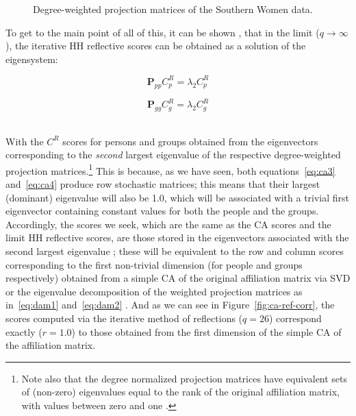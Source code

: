 \documentclass[a4paper,fleqn]{cas-sc}
\begin{document}
\begin{figure}[ht!]
\begin{subfigure}[b]{0.55\textwidth}
    \end{subfigure}
    \caption{Degree-weighted projection matrices of the Southern Women data.}
    \label{fig:dwproj}
\end{figure}

To get to the main point of all of this, it can be shown \citep{van2021correspondence}, that in the limit ($q \rightarrow \infty$), the iterative HH reflective scores can be obtained as a solution of the eigensystem:

\begin{equation}
    \mathbf{P}_{pp}C^R_p = \lambda_2C^R_p
    \label{eq:dam1}
\end{equation}

\begin{equation}
    \mathbf{P}_{gg}C^R_g = \lambda_2C^R_g
    \label{eq:dam2}
\end{equation}\

With the $C^R$ scores for persons and groups obtained from the eigenvectors corresponding to the \textit{second} largest eigenvalue of the respective degree-weighted projection matrices.\footnote{Note also that the degree normalized projection matrices have equivalent sets of (non-zero) eigenvalues equal to the rank of the original affiliation matrix, with values between zero and one \citep{van2021correspondence}.}  This is because, as we have seen, both equations~\ref{eq:ca3} and~\ref{eq:ca4} produce row stochastic matrices; this means that their largest (dominant) eigenvalue will also be 1.0, which will be associated with a trivial first eigenvector containing constant values for both the people and the groups.  Accordingly, the scores we seek, which are the same as the CA scores and the limit HH reflective scores, are those stored in the eigenvectors associated with the second largest eigenvalue \citep{van2021correspondence}; these will be equivalent to the row and column scores corresponding to the first non-trivial dimension (for people and groups respectively) obtained from a simple CA of the original affiliation matrix via SVD or the eigenvalue decomposition of the weighted projection matrices as in~\ref{eq:dam1} and~\ref{eq:dam2} \citep[398, eq. 9.17]{fouss2016algorithms}. And as we can see in Figure~\ref{fig:ca-ref-corr}, the scores computed via the iterative method of reflections ($q = 26$) correspond exactly ($r = 1.0$) to those obtained from the first dimension of the simple CA of the affiliation matrix.
\end{document}

